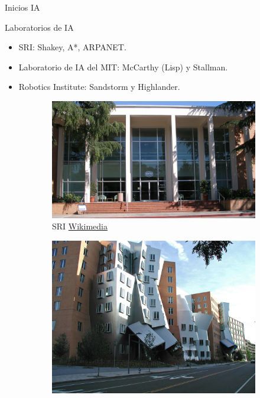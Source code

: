 
\begin{frame}[fragile]{Inicios IA}
	\vspace{10px}
	\pause
	\begin{block}{Laboratorios de IA}
		\begin{itemize}
			\item SRI: Shakey, A*, ARPANET.
			\pause
			\item Laboratorio de IA del MIT: McCarthy (Lisp) y Stallman.
			\pause
			\item Robotics Institute: Sandstorm y Highlander.
		\end{itemize}
	\end{block}
	\begin{figure}
		\centering
		\pause
		\begin{subfigure}{0.33\textwidth}
			\centering
			\includegraphics[scale=0.038]{./EtapaModerna/Imagenes/sri.jpg}
			\caption{SRI \href{https://es.m.wikipedia.org/wiki/Archivo:SRI_International_HQ.jpg}{Wikimedia}}
		\end{subfigure}
		\pause
		\begin{subfigure}{0.32\textwidth}
			\centering
			\includegraphics[scale=0.04]{./EtapaModerna/Imagenes/mit_ai.jpg}

\end{subfigure}
\end{figure}
\end{frame}
